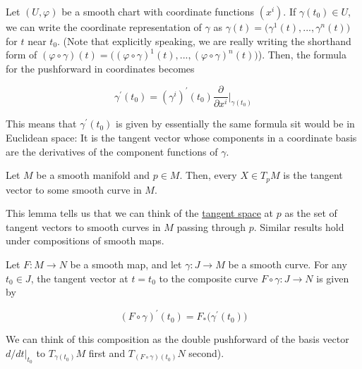 \documentclass{article}
\newcounter{theorem}[section]
\begin{document}
    Let $(U, \varphi)$ be a smooth chart with coordinate functions $(x^i)$. If $\gamma(t_0) \in U$, we can write the coordinate representation of $\gamma$ as $\gamma(t) = \big( \gamma^1 (t), ..., \gamma^n (t)\big)$ for $t$ near $t_0$. (Note that explicitly speaking, we are really writing the shorthand form of $(\varphi \circ \gamma) (t) = \big( (\varphi \circ \gamma)^1 (t), ..., (\varphi \circ \gamma)^n (t)\big)$). Then, the formula  for the pushforward in coordinates becomes 

      \begin{equation}
        \gamma^\prime (t_0) = (\gamma^i)^\prime (t_0) \frac{\partial}{\partial x^i} \bigg|_{\gamma(t_0)}
      \end{equation}

    This means that $\gamma^\prime (t_0)$ is given by essentially the same formula sit would be in Euclidean space: It is the tangent vector whose components in a coordinate basis are the derivatives of the component functions of $\gamma$. 

    \begin{lemma}
      \label{thm:every-tangent-vector-is-tangent-to-a-curve}
      Let $M$ be a smooth manifold and $p \in M$. Then, every $X \in T_p M$ is the tangent vector to some smooth curve in $M$. 
    \end{lemma}

    This lemma tells us that we can think of the \hyperref[mv-def:tangent-space]{tangent space} at $p$ as the set of tangent vectors to smooth curves in $M$ passing through $p$. Similar results hold under compositions of smooth maps. 

    \begin{theorem}
      \label{thm:pushforward-of-a-velocity-vector}
      Let $F: M \to N$ be a smooth map, and let $\gamma: J \to M$ be a smooth curve. For any $t_0 \in J$, the tangent vector at $t = t_0$ to the composite curve $F \circ \gamma: J \to N$ is given by 

        \begin{equation}
          (F \circ \gamma)^\prime (t_0) = F_* \big( \gamma^\prime (t_0) \big)
        \end{equation}

      We can think of this composition as the double pushforward of the basis vector $d/dt \big|_{t_0}$ to $T_{\gamma(t_0)} M$ first and $T_{(F \circ \gamma)(t_0)} N$ second). 
    \end{theorem}
\end{document}
